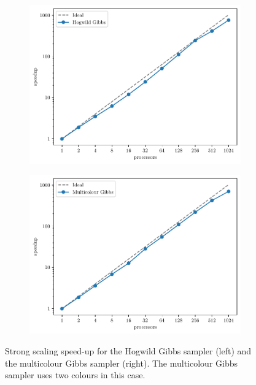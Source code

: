 \documentclass[
fontsize=11pt,
paper=a4,
numbers=noenddot
]{scrartcl}
\begin{document}
\begin{figure}[htpb]
    \centering
    \begin{subfigure}[b]{0.49\textwidth}
        \centering
        \includegraphics[width=\textwidth]{plots/strong_scaling_hogwild_4097x4097.pdf}
    \end{subfigure}
    \hfill
    \begin{subfigure}[b]{0.49\textwidth}
        \centering
        \includegraphics[width=\textwidth]{plots/strong_scaling_gibbs_4097x4097.pdf}
      \end{subfigure}
      \caption{Strong scaling speed-up for the Hogwild Gibbs sampler (left) and the multicolour Gibbs sampler (right). The multicolour Gibbs sampler uses two colours in this case.}
    \label{fig:2d_structured_ss}
\end{figure}
\end{document}

